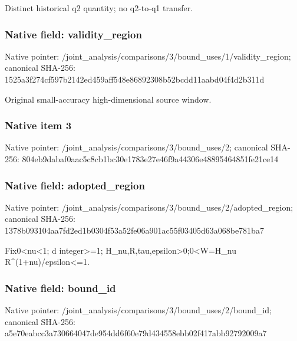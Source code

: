 \documentclass[10pt,a4paper]{article}
\begin{document}
\begingroup\raggedright\sloppy Distinct historical q2 quantity;\allowbreak{} no q2-to-q1 transfer.\par\endgroup

\subsubsection{Native field: validity\_\allowbreak{}region}
Native pointer: /joint\_\allowbreak{}analysis/comparisons/3/bound\_\allowbreak{}uses/1/validity\_\allowbreak{}region; canonical SHA-256: 1525a3f274cf597b2142ed459aff548e86892308b52bcdd11aabd04f4d2b311d

\begingroup\raggedright\sloppy Original small-accuracy high-dimensional source window.\par\endgroup

\subsubsection{Native item 3}
Native pointer: /joint\_\allowbreak{}analysis/comparisons/3/bound\_\allowbreak{}uses/2; canonical SHA-256: 804eb9dabaf0aac5c8cb1bc30e1783e27e46f9a44306e48895464851fe21ce14

\subsubsection{Native field: adopted\_\allowbreak{}region}
Native pointer: /joint\_\allowbreak{}analysis/comparisons/3/bound\_\allowbreak{}uses/2/adopted\_\allowbreak{}region; canonical SHA-256: 1378b093104aa7fd2ed1b0304f53a52fe06a901ac55f03405d63a068be781ba7

\begingroup\raggedright\sloppy Fix0<nu<1;\allowbreak{} d integer>=\allowbreak{}1;\allowbreak{} H\_\allowbreak{}nu,\allowbreak{}R,\allowbreak{}tau,\allowbreak{}epsilon>0;\allowbreak{}0<W=\allowbreak{}H\_\allowbreak{}nu R\textasciicircum{}(1+nu)/\allowbreak{}epsilon<=\allowbreak{}1.\par\endgroup

\subsubsection{Native field: bound\_\allowbreak{}id}
Native pointer: /joint\_\allowbreak{}analysis/comparisons/3/bound\_\allowbreak{}uses/2/bound\_\allowbreak{}id; canonical SHA-256: a5e70eabcc3a730664047de954dd6f60e79d434558ebb02f417abb92792009a7
\end{document}

